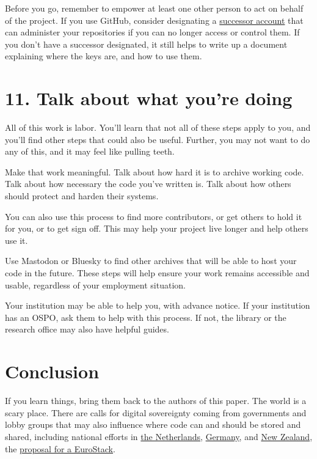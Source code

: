 \documentclass[10pt,letterpaper]{article}
\begin{document}
Before you go,
remember to empower at least one other person to act on behalf of the project.
If you use GitHub,
consider designating a
\href{https://docs.github.com/en/account-and-profile/setting-up-and-managing-your-personal-account-on-github/managing-access-to-your-personal-repositories/maintaining-ownership-continuity-of-your-personal-accounts-repositories}{successor account}
that can administer your repositories if you can no longer access or control them.
If you don't have a successor designated,
it still helps to write up a document explaining where the keys are,
and how to use them.

\section*{11. Talk about what you're doing}

All of this work is labor.
You'll learn that not all of these steps apply to you,
and you'll find other steps that could also be useful.
Further, you may not want to do any of this, and it may feel like pulling teeth.

Make that work meaningful.
Talk about how hard it is to archive working code.
Talk about how necessary the code you've written is.
Talk about how others should protect and harden their systems.

You can also use this process to find more contributors,
or get others to hold it for you,
or to get sign off.
This may help your project live longer and help others use it.

Use Mastodon or Bluesky to find other archives that will be able to host your code in the future.
These steps will help ensure your work remains accessible and usable,
regardless of your employment situation.

Your institution may be able to help you,
with advance notice.
If your institution has an OSPO,
ask them to help with this process.
If not,
the library or the research office may also have helpful guides.

\section*{Conclusion}

If you learn things, bring them back to the authors of this paper.
The world is a scary place.
\cite{Tamburri2020}
  There are calls for digital sovereignty coming from governments and lobby groups
  that may also influence where code can and should be stored and shared,
  including national efforts in
  \href{https://www.reuters.com/world/europe/dutch-parliament-calls-end-reliance-us-software-2025-03-18/}{the Netherlands},
  \href{https://www.sovereign.tech/}{Germany},
  and \href{https://zenodo.org/records/15080979}{New Zealand},
  the \href{https://www.politico.eu/article/push-for-eurostack-as-eu-us-tech-tensions-grow/}{proposal for a EuroStack}.


\end{document}
